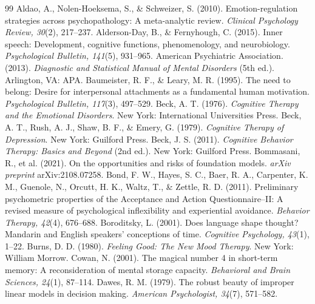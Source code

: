 \documentclass[11pt]{article}
\begin{document}
\begin{thebibliography}{99}\small
\setlength{\itemsep}{1pt}
 Aldao, A., Nolen-Hoeksema, S., \& Schweizer, S. (2010). Emotion-regulation strategies across psychopathology: A meta-analytic review. \emph{Clinical Psychology Review, 30}(2), 217--237.
 Alderson-Day, B., \& Fernyhough, C. (2015). Inner speech: Development, cognitive functions, phenomenology, and neurobiology. \emph{Psychological Bulletin, 141}(5), 931--965.
 American Psychiatric Association. (2013). \emph{Diagnostic and Statistical Manual of Mental Disorders} (5th ed.). Arlington, VA: APA.
 Baumeister, R. F., \& Leary, M. R. (1995). The need to belong: Desire for interpersonal attachments as a fundamental human motivation. \emph{Psychological Bulletin, 117}(3), 497--529.
 Beck, A. T. (1976). \emph{Cognitive Therapy and the Emotional Disorders}. New York: International Universities Press.
 Beck, A. T., Rush, A. J., Shaw, B. F., \& Emery, G. (1979). \emph{Cognitive Therapy of Depression}. New York: Guilford Press.
 Beck, J. S. (2011). \emph{Cognitive Behavior Therapy: Basics and Beyond} (2nd ed.). New York: Guilford Press.
 Bommasani, R., et al. (2021). On the opportunities and risks of foundation models. \emph{arXiv preprint} arXiv:2108.07258.
 Bond, F. W., Hayes, S. C., Baer, R. A., Carpenter, K. M., Guenole, N., Orcutt, H. K., Waltz, T., \& Zettle, R. D. (2011). Preliminary psychometric properties of the Acceptance and Action Questionnaire--II: A revised measure of psychological inflexibility and experiential avoidance. \emph{Behavior Therapy, 42}(4), 676--688.
 Boroditsky, L. (2001). Does language shape thought? Mandarin and English speakers' conceptions of time. \emph{Cognitive Psychology, 43}(1), 1--22.
 Burns, D. D. (1980). \emph{Feeling Good: The New Mood Therapy}. New York: William Morrow.
 Cowan, N. (2001). The magical number 4 in short-term memory: A reconsideration of mental storage capacity. \emph{Behavioral and Brain Sciences, 24}(1), 87--114.
 Dawes, R. M. (1979). The robust beauty of improper linear models in decision making. \emph{American Psychologist, 34}(7), 571--582.

\end{thebibliography}
\end{document}
